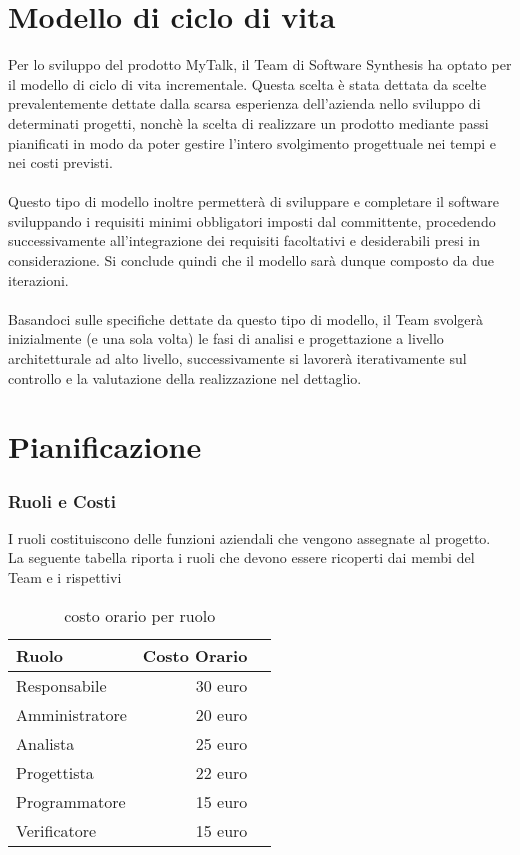 \section{Modello di ciclo di vita}
Per lo sviluppo del prodotto MyTalk, il Team di Software Synthesis ha optato per il modello di ciclo di vita incrementale. Questa scelta è stata dettata da scelte prevalentemente dettate dalla scarsa esperienza dell'azienda nello sviluppo di determinati progetti, nonchè la scelta di realizzare un prodotto mediante passi pianificati in modo da poter gestire l'intero svolgimento progettuale nei tempi e nei costi previsti.\\\\
Questo tipo di modello inoltre permetterà di sviluppare e completare il software sviluppando i requisiti minimi obbligatori imposti dal committente, procedendo successivamente all'integrazione dei requisiti facoltativi e desiderabili presi in considerazione. Si conclude quindi che il modello sarà dunque composto da due iterazioni.\\\\
Basandoci sulle specifiche dettate da questo tipo di modello, il Team svolgerà inizialmente (e una sola volta) le fasi di analisi e progettazione a livello architetturale ad alto livello, successivamente si lavorerà iterativamente sul controllo e la valutazione della realizzazione nel dettaglio.

\section{Pianificazione}
\subsubsection{Ruoli e Costi}
I ruoli  costituiscono delle funzioni aziendali che vengono assegnate al progetto.\\
La seguente tabella riporta i ruoli che devono essere ricoperti dai membi del Team e i rispettivi 
\begin{table}[h]
\centering
\begin{tabular}{|l|rl|}
\hline
Ruolo& Costo Orario&  \\
\hline
Responsabile & 30 euro &\\
Amministratore  & 20 euro&\\
Analista & 25 euro&\\
Progettista  & 22 euro&\\
Programmatore & 15 euro&\\
Verificatore & 15 euro&\\
\hline
\end{tabular}
\caption{costo orario per ruolo}
\end{table}


